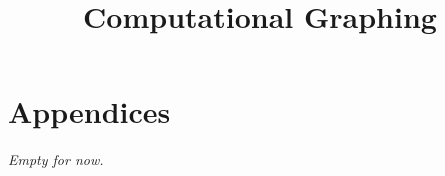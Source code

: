 \documentclass[12pt]{memoir}
\title{Computational Graphing}
\begin{document}
    \newcommand{\documentname}{System Requirements Specification}
    \newcommand{\documentversion}{0.1}
    
    \newpage

	\tableofcontents

	\newpage
    	
	

	\newpage
	
	\newpage
	
	\newpage
	\section{Appendices}
	\textit{Empty for now.}
\end{document}
